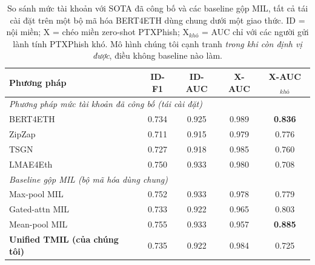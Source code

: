 \documentclass[conference]{IEEEtran}
\newcommand{\best}[1]{\textbf{#1}}
\begin{document}
\begin{table}[t]\centering\caption{So sánh mức tài khoản với SOTA đã công bố và các
baseline gộp MIL, tất cả tái cài đặt trên một bộ mã hóa BERT4ETH dùng chung dưới một
giao thức. ID = nội miền; X = chéo miền zero-shot PTXPhish; X$_{khó}$ = AUC chỉ với
các người gửi lành tính PTXPhish khó. Mô hình chúng tôi cạnh tranh \emph{trong khi
còn định vị được}, điều không baseline nào làm.}\label{tab:comp}
\begin{tabular}{lcccc}\toprule
\textbf{Phương pháp} & \textbf{ID-F1} & \textbf{ID-AUC} & \textbf{X-AUC} & \textbf{X-AUC$_{khó}$} \\\midrule
\multicolumn{5}{l}{\emph{Phương pháp mức tài khoản đã công bố (tái cài đặt)}}\\
BERT4ETH~\cite{bert4eth} & 0.734 & 0.925 & 0.989 & \best{0.836} \\
ZipZap~\cite{zipzap} & 0.711 & 0.915 & 0.979 & 0.776 \\
TSGN~\cite{tsgn} & 0.727 & 0.918 & 0.985 & 0.760 \\
LMAE4Eth~\cite{lmae4eth} & 0.750 & 0.933 & 0.980 & 0.708 \\
\midrule\multicolumn{5}{l}{\emph{Baseline gộp MIL (bộ mã hóa dùng chung)}}\\
Max-pool MIL & 0.752 & 0.933 & 0.978 & 0.779 \\
Gated-attn MIL~\cite{ilse2018} & 0.733 & 0.922 & 0.965 & 0.803 \\
Mean-pool MIL & 0.755 & 0.933 & 0.957 & \best{0.885} \\
\midrule
\textbf{Unified TMIL (của chúng tôi)} & 0.735 & 0.922 & 0.984 & 0.725 \\
\bottomrule\end{tabular}\end{table}
\end{document}

